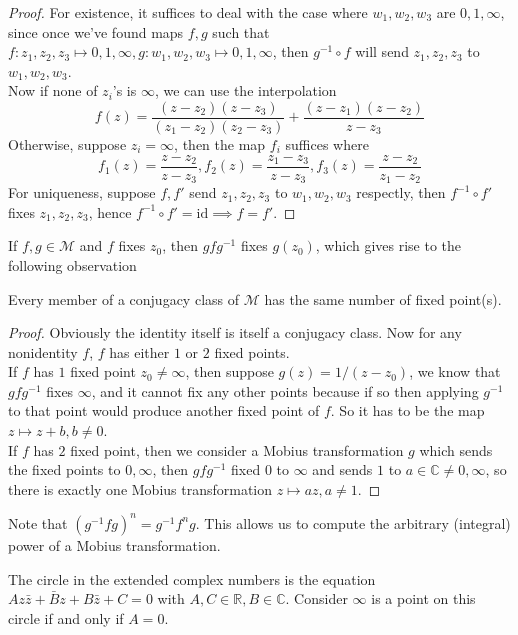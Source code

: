 \begin{proof}
    For existence, it suffices to deal with the case where $w_1,w_2,w_3$ are $0,1,\infty$, since once we've found maps $f,g$ such that $f:z_1,z_2,z_3\mapsto 0,1,\infty,g:w_1,w_2,w_3\mapsto 0,1,\infty$, then $g^{-1}\circ f$ will send $z_1,z_2,z_3$ to $w_1,w_2,w_3$.\\
    Now if none of $z_i$'s is $\infty$, we can use the interpolation
    $$f(z)=\frac{(z-z_2)(z-z_3)}{(z_1-z_2)(z_2-z_3)}+\frac{(z-z_1)(z-z_2)}{z-z_3}$$
    Otherwise, suppose $z_i=\infty$, then the map $f_i$ suffices where
    $$f_1(z)=\frac{z-z_2}{z-z_3},f_2(z)=\frac{z_1-z_3}{z-z_3}, f_3(z)=\frac{z-z_2}{z_1-z_2}$$
    For uniqueness, suppose $f,f'$ send $z_1,z_2,z_3$ to $w_1,w_2,w_3$ respectly, then $f^{-1}\circ f'$ fixes $z_1,z_2,z_3$, hence $f^{-1}\circ f'=\mathrm{id}\implies f=f'$.
\end{proof}
If $f,g\in\mathcal M$ and $f$ fixes $z_0$, then $gfg^{-1}$ fixes $g(z_0)$, which gives rise to the following observation
\begin{theorem}
    Every member of a conjugacy class of $\mathcal M$ has the same number of fixed point(s).
\end{theorem}
\begin{proof}
    Obviously the identity itself is itself a conjugacy class.
    Now for any nonidentity $f$, $f$ has either $1$ or $2$ fixed points.\\
    If $f$ has $1$ fixed point $z_0\neq\infty$, then suppose $g(z)=1/(z-z_0)$, we know that $gfg^{-1}$ fixes $\infty$, and it cannot fix any other points because if so then applying $g^{-1}$ to that point would produce another fixed point of $f$.
    So it has to be the map $z\mapsto z+b,b\neq 0$.\\
    If $f$ has $2$ fixed point, then we consider a Mobius transformation $g$ which sends the fixed points to $0,\infty$, then $gfg^{-1}$ fixed $0$ to $\infty$ and sends $1$ to $a\in\mathbb C\neq 0,\infty$, so there is exactly one Mobius transformation $z\mapsto az, a\neq 1$.
\end{proof}
Note that $(g^{-1}fg)^n=g^{-1}f^ng$.
This allows us to compute the arbitrary (integral) power of a Mobius transformation.
\begin{definition}
    The circle in the extended complex numbers is the equation $Az\bar z+\bar Bz+B\bar z+C=0$ with $A,C\in\mathbb R,B\in\mathbb C$.
    Consider $\infty$ is a point on this circle if and only if $A=0$.
\end{definition}
